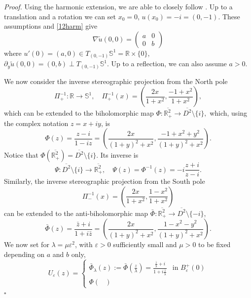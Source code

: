 \documentclass[12pt, a4paper]{article}
\newenvironment{proof}{\noindent\emph{Proof.}}{\hfill$\square$\medskip}
\newcommand{\sph}{\mathbb{S}}
\newcommand{\R}{\mathbb{R}}
\newcommand{\ve}{\varepsilon}
\newcommand{\cl}[1]{\overline{#1}}
\renewcommand{\(}{\left(}
\renewcommand{\)}{\right)}
\begin{document}
\begin{proof} Using the harmonic extension, we are able to closely follow \cite[pp. 206-207]{bc}. Up to a translation and a rotation we can set $x_0=0$, $u(x_0)=-i=(0,-1)$. These assumptions and \eqref{12harm} give
\begin{equation}\label{nablatildeu}
\nabla\tilde u(0,0)=\begin{pmatrix}
a&0\\
0&b
\end{pmatrix}
\end{equation}
where $u'(0)=(a,0)\in T_{(0,-1)}\sph^1=\R\times\{0\}$, $\partial_y\tilde u(0,0)=(0,b)\perp T_{(0,-1)}\sph^1$. Up to a reflection, we can also assume $a>0$.

We now consider the inverse stereographic projection from the North pole
$$\Pi^{-1}_+:\R\to \sph^1,\quad \Pi^{-1}_+(x)=\left( \frac{2x}{1+x^2}, \frac{-1 +x^2}{1+x^2}\right),$$ which 
can be extended to the biholomorphic map
$\Phi:\cl{\R^{2}_+}\to \cl{D^2}\setminus\{i\},$
which, using the complex notation $z=x+iy$, is
\begin{equation}\label{Phi}
\Phi(z)=\frac{z-i}{1-iz}=\left( \frac{2x}{(1+y)^2+x^2}, \frac{-1+x^2+y^2}{(1+y)^2+x^2}\right).
\end{equation}
Notice that $\Phi(\cl{\R^2_+})= \cl{D^2}\setminus\{i\}$.
Its inverse is
\begin{equation}\label{Psi}
\Psi:\cl{D^2} \setminus\{i\}\to \cl{\R^{2}_+},\quad \Psi(z)=\Phi^{-1}(z)=-i\frac{z+i}{z-i}.
\end{equation}
Similarly, the inverse stereographic projection from the South pole
$$\Pi_-^{-1}(x)=\left( \frac{2x}{1+x^2}, \frac{1-x^2}{1+x^2}\right)$$
can be extended to the anti-biholomorphic map $\bar\Phi:\cl{\R^{2}_+}\to \cl{D^2}\setminus\{-i\}$,
$$
\bar \Phi(z)=\frac{\bar z+i}{1+i\bar z}=\left( \frac{2x}{(1+y)^2+x^2}, \frac{1-x^2-y^2}{(1+y)^2+x^2}\right).
$$
We now set for $\lambda=\mu\ve^2$, with $\ve>0$ sufficiently small and $\mu>0$ to be fixed depending on $a$ and $b$ only, 
\begin{equation*}
U_\ve(z)=
\begin{cases}
\bar \Phi_\lambda(z):=\bar \Phi(\tfrac{z}{\lambda})=\frac{\frac{\bar z}{\lambda}+i}{1+i\frac{\bar z}{\lambda}} & \text{in }B_\ve^+(0)\\
\Phi\begin{pmatrix}

\end{pmatrix}
\end{cases}
\end{equation*}
\end{proof}
\end{document}
